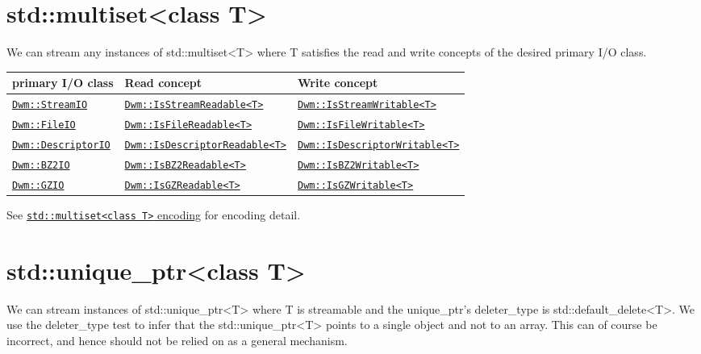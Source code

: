 \begin{minipage}{\textwidth}
\section{\ttfamily std::multiset<class T>}
We can stream any instances of {\ttfamily std::multiset<T>} where
{\ttfamily T} satisfies the read and write concepts of the desired
primary I/O class.
\vspace{1ex}

\begin{tabular}{lll}
  \textbf{primary I/O class} & \textbf{Read concept} & \textbf{Write concept} \\ \hline
  \hyperref[section:DwmStreamIOClass]{\texttt{Dwm::StreamIO}} & \hyperref[concept:DwmIsStreamReadable]{\texttt{Dwm::IsStreamReadable<T>}} & \hyperref[concept:DwmIsStreamWritable]{\texttt{Dwm::IsStreamWritable<T>}} \\
  \hyperref[section:DwmFileIOClass]{\texttt{Dwm::FileIO}} & \hyperref[concept:DwmIsFileReadable]{\texttt{Dwm::IsFileReadable<T>}} & \hyperref[concept:DwmIsFileWritable]{\texttt{Dwm::IsFileWritable<T>}} \\
  \hyperref[section:DwmDescriptorIOClass]{\texttt{Dwm::DescriptorIO}} & \hyperref[concept:DwmIsDescriptorReadable]{\texttt{Dwm::IsDescriptorReadable<T>}} & \hyperref[concept:DwmIsDescriptorWritable]{\texttt{Dwm::IsDescriptorWritable<T>}} \\
  \hyperref[section:DwmBZ2IOClass]{\texttt{Dwm::BZ2IO}} & \hyperref[concept:DwmIsBZ2Readable]{\texttt{Dwm::IsBZ2Readable<T>}} & \hyperref[concept:DwmIsBZ2Writable]{\texttt{Dwm::IsBZ2Writable<T>}} \\
  \hyperref[section:DwmGZIOClass]{\texttt{Dwm::GZIO}} & \hyperref[concept:DwmIsGZReadable]{\texttt{Dwm::IsGZReadable<T>}} & \hyperref[concept:DwmIsGZWritable]{\texttt{Dwm::IsGZWritable<T>}} \\
\end{tabular}
\vspace{1ex}

See \hyperref[encoding:stdMultiset]{\texttt{std::multiset<class T>} encoding} for encoding detail.
\end{minipage}

\begin{minipage}{\textwidth}
\section{\ttfamily std::unique\_ptr<class T>}
We can stream instances of {\ttfamily std::unique\_ptr<T>} where
{\ttfamily T} is streamable and the {\ttfamily unique\_ptr}'s
{\ttfamily deleter\_type} is {\ttfamily std::default\_delete<T>}.
We use the {\ttfamily deleter\_type} test to infer that the
{\ttfamily std::unique\_ptr<T>} points to a single object and not
to an array.  This can of course be incorrect, and hence should
not be relied on as a general mechanism.
\end{minipage}

